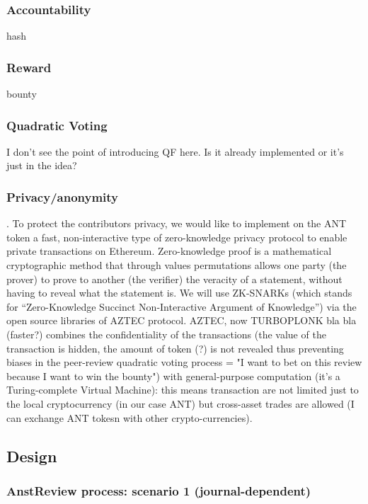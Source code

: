 \documentclass[runningheads]{llncs}
\begin{document}
\subsubsection{Accountability} hash
\subsubsection{Reward} bounty
\subsubsection{Quadratic Voting} I don't see the point of introducing QF here. Is it already implemented or it's just in the idea?

\subsubsection{Privacy/anonymity}. To protect the contributors privacy, we would like to implement on the ANT token a fast, non-interactive type of zero-knowledge privacy protocol to enable private transactions on Ethereum. Zero-knowledge proof is a mathematical cryptographic method that through values permutations allows one party (the prover) to prove to another (the verifier) the veracity of a statement, without having to reveal what the statement is. We will use ZK-SNARKs (which stands for “Zero-Knowledge Succinct Non-Interactive Argument of Knowledge”) via the open source libraries of AZTEC protocol. AZTEC, now TURBOPLONK bla bla (faster?) combines the confidentiality of the transactions (the value of the transaction is hidden, the amount of token (?) is not revealed thus preventing biases in the peer-review quadratic voting process = "I want to bet on this review because I want to win the bounty") with general-purpose computation (it's a Turing-complete Virtual Machine): this means transaction are not limited just to the local cryptocurrency (in our case ANT) but cross-asset trades are allowed (I can exchange ANT tokesn with other crypto-currencies).



\subsection{Design}

\subsubsection{AnstReview process: scenario 1 (journal-dependent)}
\end{document}
